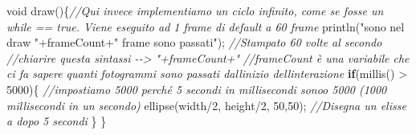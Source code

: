 \documentclass[
]{article}
\newenvironment{Shaded}{}{}
\newcommand{\CommentTok}[1]{\textcolor[rgb]{0.38,0.63,0.69}{\textit{#1}}}
\newcommand{\ControlFlowTok}[1]{\textcolor[rgb]{0.00,0.44,0.13}{\textbf{#1}}}
\newcommand{\DataTypeTok}[1]{\textcolor[rgb]{0.56,0.13,0.00}{#1}}
\newcommand{\DecValTok}[1]{\textcolor[rgb]{0.25,0.63,0.44}{#1}}
\newcommand{\FunctionTok}[1]{\textcolor[rgb]{0.02,0.16,0.49}{#1}}
\newcommand{\NormalTok}[1]{#1}
\newcommand{\OperatorTok}[1]{\textcolor[rgb]{0.40,0.40,0.40}{#1}}
\newcommand{\StringTok}[1]{\textcolor[rgb]{0.25,0.44,0.63}{#1}}
\begin{document}
\begin{Shaded}
\begin{Highlighting}[]
\DataTypeTok{void} \FunctionTok{draw}\OperatorTok{()\{}\CommentTok{//Qui invece implementiamo un ciclo infinito, come se fosse un while == true. Viene eseguito ad 1 frame di default a 60 frame}
  \FunctionTok{println}\OperatorTok{(}\StringTok{"sono nel draw "}\OperatorTok{+}\NormalTok{frameCount}\OperatorTok{+}\StringTok{" frame sono passati"}\OperatorTok{);} \CommentTok{//Stampato 60 volte al secondo //chiarire questa sintassi {-}{-}\textgreater{} "+frameCount+"}
  \CommentTok{//frameCount è una variabile che ci fa sapere quanti fotogrammi sono passati dall\textquotesingle{}inizio dell\textquotesingle{}interazione}
  \ControlFlowTok{if}\OperatorTok{(}\FunctionTok{millis}\OperatorTok{()} \OperatorTok{\textgreater{}} \DecValTok{5000}\OperatorTok{)\{} \CommentTok{//impostiamo 5000 perché 5 secondi in millisecondi sonoo 5000 (1000 millisecondi in un secondo)}
    \FunctionTok{ellipse}\OperatorTok{(}\NormalTok{width}\OperatorTok{/}\DecValTok{2}\OperatorTok{,}\NormalTok{ height}\OperatorTok{/}\DecValTok{2}\OperatorTok{,} \DecValTok{50}\OperatorTok{,}\DecValTok{50}\OperatorTok{);} \CommentTok{//Disegna un elisse a dopo 5 secondi}
  \OperatorTok{\}}
\OperatorTok{\}}
\end{Highlighting}
\end{Shaded}
\end{document}

